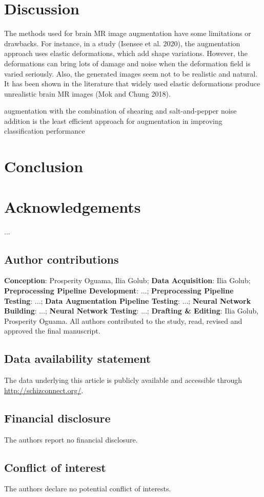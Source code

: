\lipsum[5-6]

\section{Discussion}

The methods used for brain MR image augmentation have some limitations or drawbacks. For instance, in a study (Isensee et al. 2020), the augmentation approach uses elastic deformations, which add shape variations. However, the deformations can bring lots of damage and noise when the deformation field is varied seriously. Also, the generated images seem not to be realistic and natural. It has been shown in the literature that widely used elastic deformations produce unrealistic brain MR images (Mok and Chung 2018).

augmentation with the combination of shearing and salt-and-pepper noise addition is the least efficient approach for augmentation in improving classification performance 

\section{Conclusion}

\lipsum[9-10]



\section*{Acknowledgements}

...

\subsection*{Author contributions}

\textbf{Conception}: Prosperity Oguama, Ilia Golub; \textbf{Data Acquisition}: Ilia Golub; \textbf{Preprocessing Pipeline Development}: ...; \textbf{Preprocessing Pipeline Testing}: ...; \textbf{Data Augmentation Pipeline Testing}: ...; \textbf{Neural Network Building}: ...; \textbf{Neural Network Testing}: ...; \textbf{Drafting \& Editing}: Ilia Golub, Prosperity Oguama. All authors contributed to the study, read, revised and approved the final manuscript.

\subsection*{Data availability statement}
The data underlying this article is publicly available and accessible through \hyperlink{Schizconnect}{http://schizconnect.org/}.

\subsection*{Financial disclosure}

The authors report no financial disclosure.

\subsection*{Conflict of interest}

The authors declare no potential conflict of interests.

